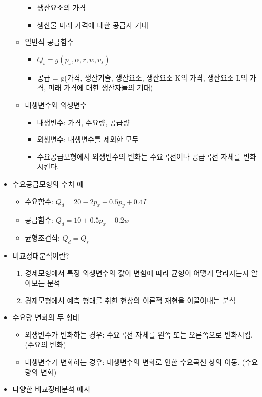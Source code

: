 \documentclass{report}
\begin{document}
\begin{itemize}
\begin{itemize}
\begin{itemize}
        \item 생산요소의 가격
        \item 생산물 미래 가격에 대한 공급자 기대
    \end{itemize}
    \item 일반적 공급함수
    \begin{itemize}
        \item $Q_s = g(p_x, \alpha, r, w, v_s)$
        \item 공급 = g(가격, 생산기술, 생산요소, 생산요소 K의 가격, 생산요소 L의 가격, 미래 가격에 대한 생산자들의 기대)
    \end{itemize}
    \item 내생변수와 외생변수
    \begin{itemize}
        \item 내생변수: 가격, 수요량, 공급량
        \item 외생변수: 내생변수를 제외한 모두
        \item 수요공급모형에서 외생변수의 변화는 수요곡선이나 공급곡선 자체를 변화시킨다.
    \end{itemize}
    \end{itemize}
    \item 수요공급모형의 수치 예
    \begin{itemize}
        \item 수요함수: $Q_d = 20-2p_x+0.5p_y+0.4I$
        \item 공급함수: $Q_d = 10+0.5p_x-0.2w$
        \item 균형조건식: $Q_d = Q_s$
    \end{itemize}
    \item 비교정태분석이란?
    \begin{enumerate}
        \item 경제모형에서 특정 외생변수의 값이 변함에 따라 균형이 어떻게 달라지는지 알아보는 분석
        \item 경제모형에서 예측 형태를 취한 현상의 이론적 재현을 이끌어내는 분석
    \end{enumerate}
    \item 수요량 변화의 두 형태
    \begin{itemize}
        \item 외생변수가 변화하는 경우: 수요곡선 자체를 왼쪽 또는 오른쪽으로 변화시킴. (수요의 변화)
        \item 내생변수가 변화하는 경우: 내생변수의 변화로 인한 수요곡선 상의 이동. (수요량의 변화)
    \end{itemize}
    \item 다양한 비교정태분석 예시

\end{itemize}
\end{document}
